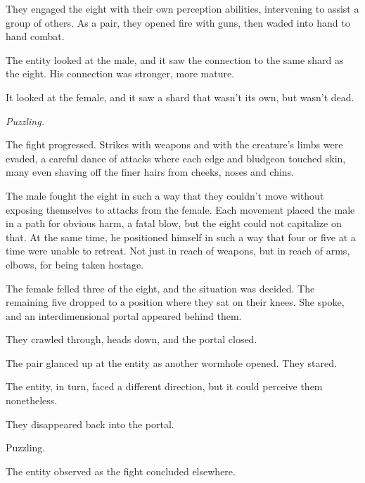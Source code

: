 They engaged the eight with their own perception abilities, intervening to assist a group of others.  As a pair, they opened fire with guns, then waded into hand to hand combat.



The entity looked at the male, and it saw the connection to the same shard as the eight.  His connection was stronger, more mature.



It looked at the female, and it saw a shard that wasn't its own, but wasn't dead.



\emph{Puzzling.}



The fight progressed.  Strikes with weapons and with the creature's limbs were evaded, a careful dance of attacks where each edge and bludgeon touched skin, many even shaving off the finer hairs from cheeks, noses and chins.



The male fought the eight in such a way that they couldn't move without exposing themselves to attacks from the female.  Each movement placed the male in a path for obvious harm, a fatal blow, but the eight could not capitalize on that.  At the same time, he positioned himself in such a way that four or five at a time were unable to retreat.  Not just in reach of weapons, but in reach of arms, elbows, for being taken hostage.



The female felled three of the eight, and the situation was decided.  The remaining five dropped to a position where they sat on their knees.  She spoke, and an interdimensional portal appeared behind them.



They crawled through, heads down, and the portal closed.



The pair glanced up at the entity as another wormhole opened.  They stared.



The entity, in turn, faced a different direction, but it could perceive them nonetheless.



They disappeared back into the portal.



Puzzling.



The entity observed as the fight concluded elsewhere.



